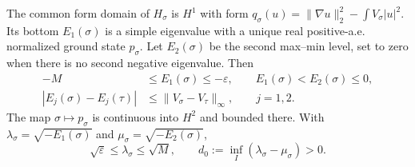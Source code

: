 \begin{proposition}
  \label{P:compact-ground-family}
  The common form domain of $H_\sigma$ is $H^1$ with form
  $q_\sigma(u)=\|\nabla u\|_2^2-\int V_\sigma|u|^2$.
  Its bottom $E_1(\sigma)$ is a simple eigenvalue with a unique
  real positive-a.e. normalized ground state $p_\sigma$.
  Let $E_2(\sigma)$ be the second max--min level, set to zero when
  there is no second negative eigenvalue. Then
  \begin{align}
    -M&\le E_1(\sigma)\le-\varepsilon,\qquad
    E_1(\sigma)<E_2(\sigma)\le0,\label{E:compact-energy-levels}\\
    |E_j(\sigma)-E_j(\tau)|
    &\le\|V_\sigma-V_\tau\|_\infty,\qquad j=1,2.
    \label{E:compact-level-continuity}
  \end{align}
  The map $\sigma\mapsto p_\sigma$ is continuous into $H^2$ and
  bounded there. With
  $\lambda_\sigma=\sqrt{-E_1(\sigma)}$ and
  $\mu_\sigma=\sqrt{-E_2(\sigma)}$,
  \begin{equation}\label{E:compact-rate-gap}
    \sqrt\varepsilon\le\lambda_\sigma\le\sqrt M,\qquad
    d_0:=\inf_I(\lambda_\sigma-\mu_\sigma)>0.
  \end{equation}
\end{proposition}


